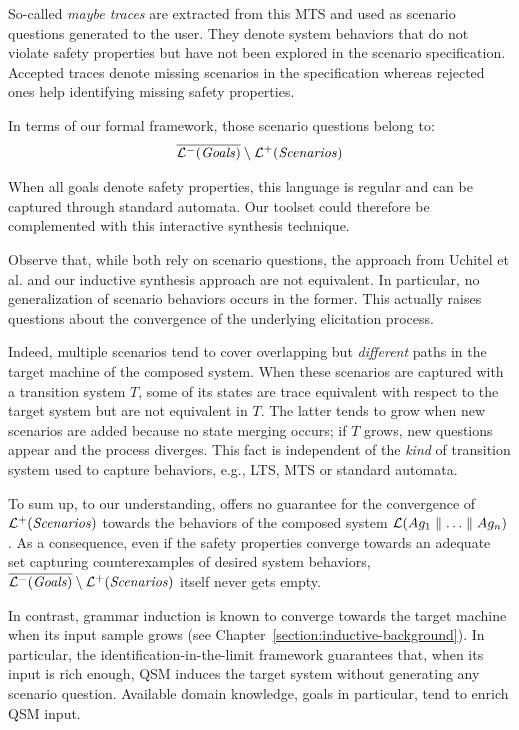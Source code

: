 So-called \emph{maybe traces} are extracted from this MTS and used as scenario questions generated to the user. They denote system behaviors that do not violate safety properties but have not been explored in the scenario specification. Accepted traces denote missing scenarios in the specification whereas rejected ones help identifying missing safety properties. 

In terms of our formal framework, those scenario questions belong to:
\begin{align*}
\overline{\mathcal{L}^-(\mbox{\emph{Goals}})} \setminus \mathcal{L}^+(\mbox{\emph{Scenarios}})
\end{align*}

When all goals denote safety properties, this language is regular and can be captured through standard automata. Our toolset could therefore be complemented with this interactive synthesis technique.

Observe that, while both rely on scenario questions, the approach from Uchitel et al. and our inductive synthesis approach are not equivalent. In particular, no generalization of scenario behaviors occurs in the former. This actually raises questions about the convergence of the underlying elicitation process. 

Indeed, multiple scenarios tend to cover overlapping but \emph{different} paths in the target machine of the composed system. When these scenarios are captured with a transition system $T$, some of its states are trace equivalent with respect to the target system but are not equivalent in $T$. The latter tends to grow when new scenarios are added because no state merging occurs; if $T$ grows, new questions appear and the process diverges. This fact is independent of the \emph{kind} of transition system used to capture behaviors, e.g., LTS, MTS or standard automata. 

To sum up, to our understanding, \cite{Uchitel:2009} offers no guarantee for the convergence of $\mathcal{L}^+(\mbox{\emph{Scenarios}})$ towards the behaviors of the composed system $\mathcal{L}(Ag_1 \parallel \ldots \parallel Ag_n)$. As a consequence, even if the safety properties converge towards an adequate set capturing counterexamples of desired system behaviors, $\overline{\mathcal{L}^-(\mbox{\emph{Goals}})} \setminus \mathcal{L}^+(\mbox{\emph{Scenarios}})$ itself never gets empty.

In contrast, grammar induction is known to converge towards the target machine when its input sample grows \cite{Oncina:1993} (see Chapter~\ref{section:inductive-background}). In particular, the identification-in-the-limit framework guarantees that, when its input is rich enough, QSM induces the target system without generating any scenario question. Available domain knowledge, goals in particular, tend to enrich QSM input.

